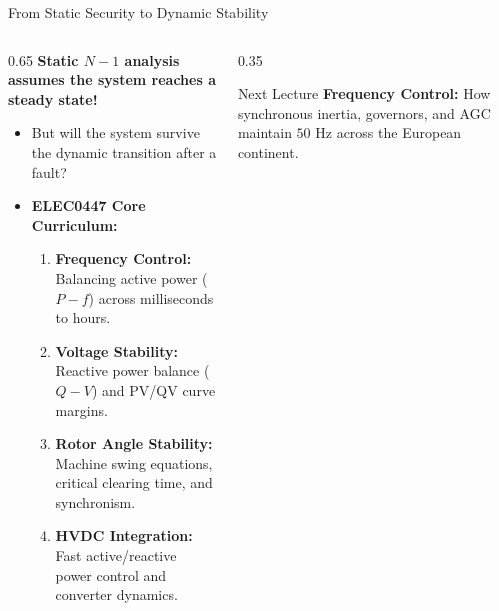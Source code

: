 \begin{frame}{From Static Security to Dynamic Stability}
\begin{columns}[T]
\begin{column}{0.65\textwidth}
    \footnotesize
    \textbf{Static $N-1$ analysis assumes the system reaches a steady state!}
    \begin{itemize}
        \item But will the system survive the dynamic transition after a fault?
        \item \textbf{ELEC0447 Core Curriculum:}
        \begin{enumerate}
            \item \textbf{Frequency Control:} Balancing active power ($P-f$) across milliseconds to hours.
            \item \textbf{Voltage Stability:} Reactive power balance ($Q-V$) and PV/QV curve margins.
            \item \textbf{Rotor Angle Stability:} Machine swing equations, critical clearing time, and synchronism.
            \item \textbf{HVDC Integration:} Fast active/reactive power control and converter dynamics.
        \end{enumerate}
    \end{itemize}
\end{column}
\begin{column}{0.35\textwidth}
    \begin{block}{Next Lecture}
    \scriptsize
    \textbf{Frequency Control:}
    How synchronous inertia, governors, and AGC maintain $50\text{ Hz}$ across the European continent.
    \end{block}
\end{column}
\end{columns}
\end{frame}